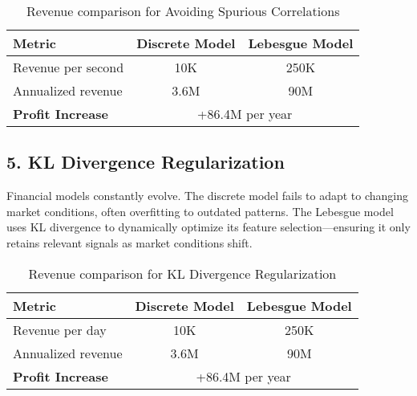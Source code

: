 \begin{table}[h]
    \centering
    \small
    \renewcommand{\arraystretch}{1.2}
    \begin{tabular}{lcc}
        \toprule
        \textbf{Metric} & \textbf{Discrete Model} & \textbf{Lebesgue Model} \\
        \midrule
        Revenue per second & 10K & 250K \\
        Annualized revenue & 3.6M & 90M \\
        \textbf{Profit Increase} & \multicolumn{2}{c}{+86.4M per year} \\
        \bottomrule
    \end{tabular}
    \caption{Revenue comparison for Avoiding Spurious Correlations}
\end{table}

\subsection{5. KL Divergence Regularization}

\noindent Financial models constantly evolve. The discrete model fails to adapt to changing market conditions, often overfitting to outdated patterns. The Lebesgue model uses KL divergence to dynamically optimize its feature selection—ensuring it only retains relevant signals as market conditions shift.

\begin{table}[h]
    \centering
    \small
    \renewcommand{\arraystretch}{1.2}
    \begin{tabular}{lcc}
        \toprule
        \textbf{Metric} & \textbf{Discrete Model} & \textbf{Lebesgue Model} \\
        \midrule
        Revenue per day & 10K & 250K \\
        Annualized revenue & 3.6M & 90M \\
        \textbf{Profit Increase} & \multicolumn{2}{c}{+86.4M per year} \\
        \bottomrule
    \end{tabular}
    \caption{Revenue comparison for KL Divergence Regularization}
\end{table}